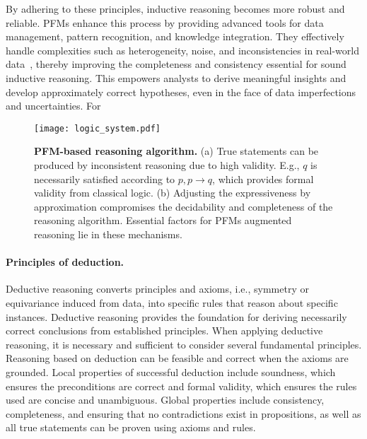By adhering to these principles, inductive reasoning becomes more robust and reliable. PFMs enhance this process by providing advanced tools for data management, pattern recognition, and knowledge integration. They effectively handle complexities such as heterogeneity, noise, and inconsistencies in real-world data~\cite{vos2022towards, deem}, thereby improving the completeness and consistency essential for sound inductive reasoning. This empowers analysts to derive meaningful insights and develop approximately correct hypotheses, even in the face of data imperfections and uncertainties. For


\begin{figure*}[h]
  \centering
  \texttt{[image: logic\_system.pdf]} %
  \caption{\textbf{PFM-based reasoning algorithm.} (a) True statements can be produced by inconsistent reasoning due to high validity. E.g., $q$ is necessarily satisfied according to $p, p\rightarrow q$, which provides formal validity from classical logic. (b) Adjusting the expressiveness by approximation compromises the decidability and completeness of the reasoning algorithm. Essential factors for PFMs augmented reasoning lie in these mechanisms.}
  \label{fig:logic_system}
\end{figure*}


\paragraph{Principles of deduction.} Deductive reasoning converts principles and axioms, i.e., symmetry or equivariance induced from data, into specific rules that reason about specific instances. Deductive reasoning provides the foundation for deriving necessarily correct conclusions from established principles. When applying deductive reasoning, it is necessary and sufficient to consider several fundamental principles. Reasoning based on deduction can be feasible and correct when the axioms are grounded. Local properties of successful deduction include soundness, which ensures the preconditions are correct and formal validity, which ensures the rules used are concise and unambiguous. Global properties include consistency, completeness, and ensuring that no contradictions exist in propositions, as well as all true statements can be proven using axioms and rules.

